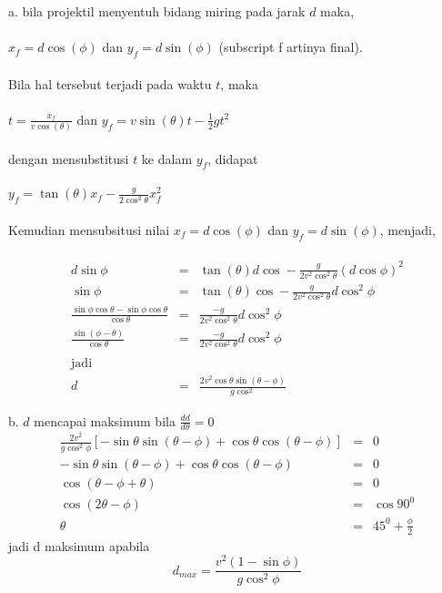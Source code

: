 \begin{solution}
a. bila projektil menyentuh bidang miring pada jarak $d$ maka, \\ \\$x_{f}=d \cos\left(\phi\right)$ dan $y_{f}=d \sin\left(\phi\right)$ (subscript f artinya final). \\ \\
Bila hal tersebut terjadi pada waktu $t$, maka \\ \\ $t=\frac{x_{f}}{v \cos\left(\theta\right)}$ dan $y_{f}=v \sin\left(\theta\right) t-\frac{1}{2}g t^{2}$ \\ \\
dengan mensubstitusi $t$ ke dalam $y_{f}$, didapat \\ \\
$y_{f}=\tan\left(\theta\right) x_{f}-\frac{g }{2 \cos^{2} \theta}x_{f}^{2}  $\\ \\
Kemudian mensubsitusi nilai $x_{f}=d \cos\left(\phi\right)$ dan $y_{f}=d \sin\left(\phi\right)$, menjadi, \\ \\
\begin{eqnarray*}
d \sin \phi &=& \tan\left(\theta\right) d \cos-\frac{g }{2 v^{2} \cos^{2} \theta}\left(d \cos \phi\right)^{2} \\
 \sin \phi &=& \tan\left(\theta\right) \cos-\frac{g }{2 v^{2} \cos^{2} \theta} d  \cos^{2} \phi \\
 \frac{\sin \phi \cos \theta-\sin \phi \cos \theta}{\cos \theta} &=& \frac{-g}{2 v^2 \cos^2 \theta} d \cos^{2} \phi \\
 \frac{\sin \left(\phi-\theta\right)}{\cos \theta}&=& \frac{-g}{2 v^2 \cos^2 \theta} d \cos^{2} \phi \\ \\
 \mbox{jadi} \\
  d&=&\frac{2 v^2 \cos \theta \sin \left(\theta-\phi\right)}{g \cos^{2} }
\end{eqnarray*}

b. $d$ mencapai maksimum bila $\frac{d d}{d \theta}=0$
\begin{eqnarray*}
\frac{2 v^{2}}{g \cos^{2} \phi}\left[-\sin \theta \sin \left(\theta-\phi\right)+\cos \theta \cos\left(\theta-\phi\right)\right] &=& 0 \\
-\sin \theta \sin \left(\theta-\phi\right)+\cos \theta \cos\left(\theta-\phi\right) &=& 0 \\
\cos \left(\theta-\phi+\theta\right) &=& 0 \\
\cos \left(2\theta-\phi\right) &=& \cos 90^{0} \\
\theta &=& 45^{0}+\frac{\phi}{2}
\end{eqnarray*}
jadi d maksimum apabila
\begin{equation}
d_{max}=\frac{v^{2}\left(1-\sin \phi\right)}{g \cos^{2} \phi}
\end{equation}
\end{solution}
